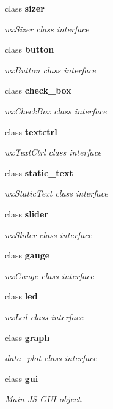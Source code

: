 \begin{DoxyCompactItemize}
class \textbf{ sizer}
\begin{DoxyCompactList}\small\item\em wx\+Sizer class interface \end{DoxyCompactList}\item 
class \textbf{ button}
\begin{DoxyCompactList}\small\item\em wx\+Button class interface \end{DoxyCompactList}\item 
class \textbf{ check\+\_\+box}
\begin{DoxyCompactList}\small\item\em wx\+Check\+Box class interface \end{DoxyCompactList}\item 
class \textbf{ textctrl}
\begin{DoxyCompactList}\small\item\em wx\+Text\+Ctrl class interface \end{DoxyCompactList}\item 
class \textbf{ static\+\_\+text}
\begin{DoxyCompactList}\small\item\em wx\+Static\+Text class interface \end{DoxyCompactList}\item 
class \textbf{ slider}
\begin{DoxyCompactList}\small\item\em wx\+Slider class interface \end{DoxyCompactList}\item 
class \textbf{ gauge}
\begin{DoxyCompactList}\small\item\em wx\+Gauge class interface \end{DoxyCompactList}\item 
class \textbf{ led}
\begin{DoxyCompactList}\small\item\em wx\+Led class interface \end{DoxyCompactList}\item 
class \textbf{ graph}
\begin{DoxyCompactList}\small\item\em data\+\_\+plot class interface \end{DoxyCompactList}\item 
class \textbf{ gui}
\begin{DoxyCompactList}\small\item\em Main JS G\+UI object. \end{DoxyCompactList}\end{DoxyCompactItemize}
